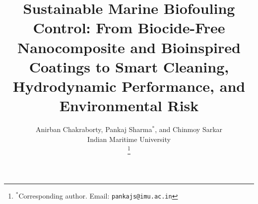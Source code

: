 \documentclass[journal,10pt,twocolumn]{IEEEtran}
\begin{document}
\title{Sustainable Marine Biofouling Control: From Biocide-Free Nanocomposite and Bioinspired Coatings to Smart Cleaning, Hydrodynamic Performance, and Environmental Risk}

\author{Anirban Chakraborty, Pankaj Sharma$^*$, and Chinmoy Sarkar\\
Indian Maritime University\\
\thanks{$^*$Corresponding author. Email: \texttt{pankajs@imu.ac.in}}}

\maketitle













\end{document}
